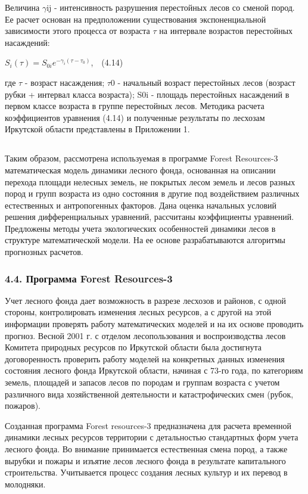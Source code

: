 \documentclass{report}
\begin{document}
Величина $\gamma $ij - интенсивность разрушения перестойных лесов со сменой пород. Ее расчет основан на предположении
существования экспоненциальной зависимости  этого процесса от возраста $\tau $ на интервале возрастов перестойных
насаждений:

 $S_i\left(\tau \right)=S_{0i}e^{-\gamma _i\left(\tau -\tau _0\right)}$,\ \   (4.14)

где $\tau $ - возраст насаждения; $\tau $0 -  начальный возраст  перестойных лесов (возраст рубки + интервал класса
возраста);  S0i  {}- площадь перестойных насаждений в первом классе возраста в группе перестойных лесов. Методика
расчета коэффициентов уравнения (4.14) и полученные результаты по лесхозам Иркутской области представлены в Приложении
1.  

\subsection{}
Таким образом, рассмотрена используемая в программе Forest Resources{}-3 математическая модель динамики лесного фонда,
основанная на описании перехода площади нелесных земель, не покрытых лесом земель и лесов разных пород и групп возраста
из одно состояния в другие под воздействием различных естественных и антропогенных факторов. Дана оценка начальных
условий решения дифференциальных уравнений, рассчитаны коэффициенты уравнений. Предложены методы учета экологических
особенностей динамики лесов в структуре математической модели. На ее основе разрабатываются алгоритмы прогнозных
расчетов.  

\subsubsection[4.4. Программа Forest Resources{}-3]{4.4. Программа Forest Resources-3}
Учет лесного фонда дает возможность в разрезе лесхозов и районов, с одной стороны,  контролировать изменения лесных
ресурсов, а с другой на этой информации проверять работу математических моделей и на их основе проводить прогноз.
Весной 2001 г. с отделом лесопользования и воспроизводства лесов Комитета природных ресурсов по Иркутской области была
достигнута договоренность проверить работу моделей на конкретных данных изменения состояния лесного фонда Иркутской
области, начиная с 73-го года, по  категориям земель, площадей и запасов лесов по породам и группам возраста с учетом
различного вида хозяйственной деятельности и катастрофических смен (рубок, пожаров).

Созданная программа Forest resources{}-3 предназначена для расчета временной динамики лесных ресурсов территории с
детальностью стандартных форм учета лесного фонда. Во внимание принимается естественная смена пород, а также вырубки и
пожары и изъятие лесов лесного фонда в результате капитального строительства. Учитывается процесс создания лесных
культур и их перевод в молодняки.
\end{document}
